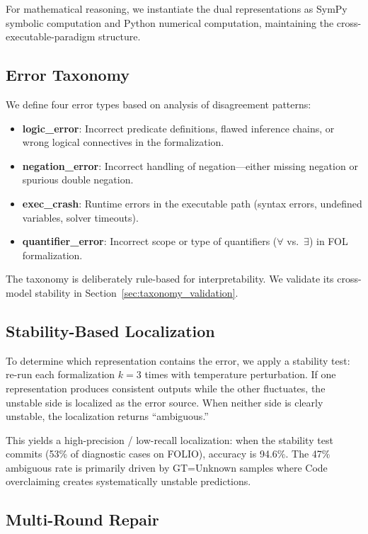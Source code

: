 \documentclass[11pt,a4paper]{article}
\begin{document}
For mathematical reasoning, we instantiate the dual representations as SymPy symbolic computation and Python numerical computation, maintaining the cross-executable-paradigm structure.

\subsection{Error Taxonomy}

We define four error types based on analysis of disagreement patterns:

\begin{itemize}
\item \textbf{logic\_error}: Incorrect predicate definitions, flawed inference chains, or wrong logical connectives in the formalization.
\item \textbf{negation\_error}: Incorrect handling of negation---either missing negation or spurious double negation.
\item \textbf{exec\_crash}: Runtime errors in the executable path (syntax errors, undefined variables, solver timeouts).
\item \textbf{quantifier\_error}: Incorrect scope or type of quantifiers ($\forall$ vs.\ $\exists$) in FOL formalization.
\end{itemize}

The taxonomy is deliberately rule-based for interpretability. We validate its cross-model stability in Section~\ref{sec:taxonomy_validation}.

\subsection{Stability-Based Localization}

To determine which representation contains the error, we apply a stability test: re-run each formalization $k\!=\!3$ times with temperature perturbation. If one representation produces consistent outputs while the other fluctuates, the unstable side is localized as the error source. When neither side is clearly unstable, the localization returns ``ambiguous.''

This yields a high-precision / low-recall localization: when the stability test commits (53\% of diagnostic cases on FOLIO), accuracy is 94.6\%. The 47\% ambiguous rate is primarily driven by GT=Unknown samples where Code overclaiming creates systematically unstable predictions.

\subsection{Multi-Round Repair}
\end{document}

